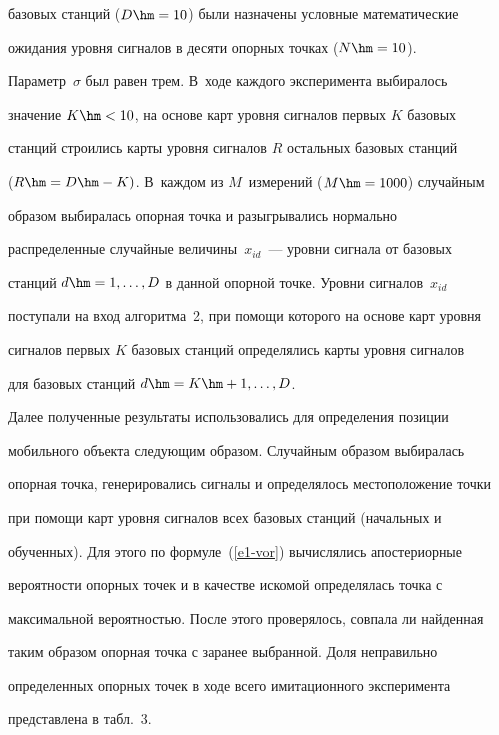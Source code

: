 базовых станций ($D\hm = 10$) были назначены условные математические

ожидания уровня сигналов в десяти опорных точках ($N\hm = 10$).

Параметр~$\sigma$ был равен трем. В~ходе каждого эксперимента выбиралось

значение $K\hm<10$, на основе карт уровня сигналов первых $K$ базовых

станций строились карты уровня сигналов $R$ остальных базовых станций

($R\hm= D \hm- K)$. В~каждом из $M$~измерений ($M\hm = 1000$) случайным

образом выбиралась опорная точка и разыгрывались нормально

распределенные случайные величины~$x_{id}$~--- уровни сигнала от базовых

станций $d\hm=1,\ldots , D$ в данной опорной точке. Уровни сигналов~$x_{id}$

поступали на вход алгоритма~2, при помощи которого на основе карт уровня

сигналов первых $K$ базовых станций определялись карты уровня сигналов

для базовых станций $d\hm= K\hm+1,\ldots , D$.



 Далее полученные результаты использовались для определения позиции

мобильного объекта следующим образом. Случайным образом выбиралась

опорная точка, генерировались сигналы и определялось местоположение точки

при помощи карт уровня сигналов всех базовых станций (начальных и

обученных). Для этого по формуле~(\ref{e1-vor}) вычислялись апостериорные

вероятности опорных точек и в качестве искомой определялась точка с

максимальной вероятностью. После этого проверялось, совпала ли найденная

таким образом опорная точка с заранее выбранной. Доля неправильно

определенных опорных точек в ходе всего имитационного эксперимента

представлена в табл.~3.



